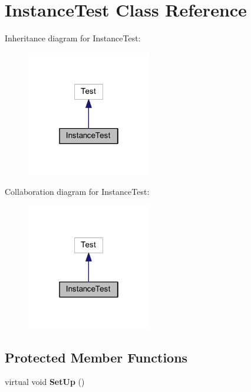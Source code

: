 \hypertarget{class_instance_test}{}\section{Instance\+Test Class Reference}
\label{class_instance_test}


Inheritance diagram for Instance\+Test\+:
\nopagebreak
\begin{figure}[H]
\begin{center}
\leavevmode
\includegraphics[width=154pt]{class_instance_test__inherit__graph}
\end{center}
\end{figure}


Collaboration diagram for Instance\+Test\+:
\nopagebreak
\begin{figure}[H]
\begin{center}
\leavevmode
\includegraphics[width=154pt]{class_instance_test__coll__graph}
\end{center}
\end{figure}
\subsection*{Protected Member Functions}
\begin{DoxyCompactItemize}
\item 
\hypertarget{class_instance_test_aada9591781662307abc3e7511d14187c}{}\label{class_instance_test_aada9591781662307abc3e7511d14187c} 
virtual void {\bfseries Set\+Up} ()
\end{DoxyCompactItemize}
